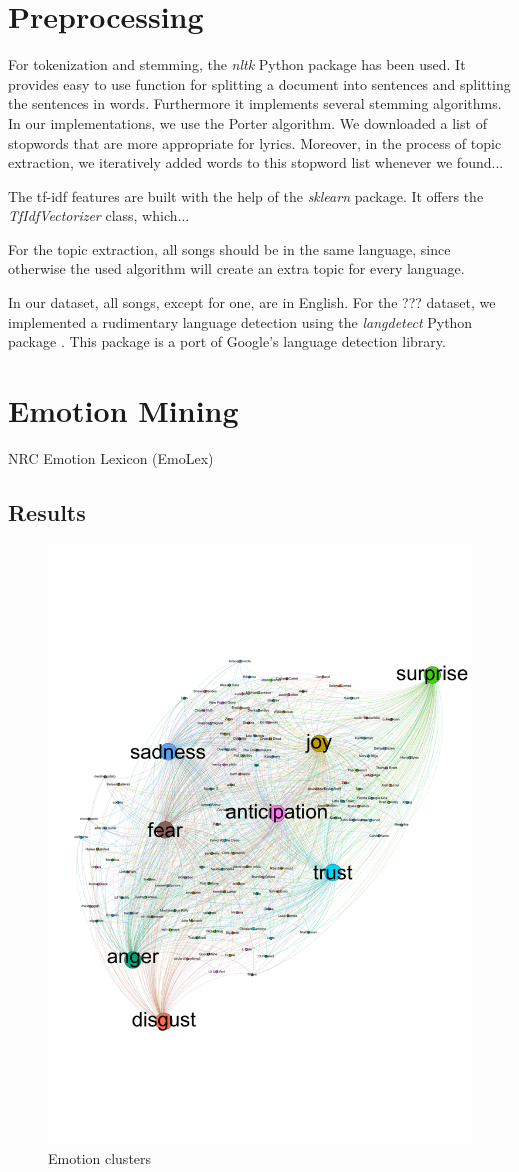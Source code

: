 \documentclass[10pt,a4paper]{article}
\begin{document}
	\section{Preprocessing}	
	For tokenization and stemming, the \textit{nltk} Python package has been used. It provides easy to use function for splitting a document into sentences and splitting the sentences in words. Furthermore it implements several stemming algorithms. In our implementations, we use the Porter algorithm. We downloaded a list of stopwords that are more appropriate for lyrics. Moreover, in the process of topic extraction, we iteratively added words to this stopword list whenever we found...
	
	The tf-idf features are built with the help of the \textit{sklearn} package. It offers the \textit{TfIdfVectorizer} class, which...
	
	For the topic extraction, all songs should be in the same language, since otherwise the used algorithm will create an extra topic for every language.
	
	In our dataset, all songs, except for one, are in English. For the ??? dataset, we implemented a rudimentary language detection using the \textit{langdetect} Python package \cite{langdetect}. This package is a port of Google's language detection library.
	
	\section{Emotion Mining}
	NRC Emotion Lexicon (EmoLex)
	
		\subsection{Results}
		
		\begin{figure}[htb]
			\centering
			\includegraphics[trim=0mm 50mm 0mm 50mm, clip, width=0.7\linewidth]{data/emotion_clusters}
			\caption{Emotion clusters}
			\label{fig:emotionclusters}
		\end{figure}
	
\end{document}

